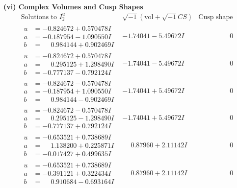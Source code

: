 \documentclass[1p]{elsarticle_modified}
\theoremstyle{definition}
\newcommand{\I}{\sqrt{-1}}
\begin{document}
\newpage\flushleft \textbf{(vi) Complex Volumes and Cusp Shapes}
$$\begin{array}{c|c|c}  
\text{Solutions to }I^u_{2}& \I (\text{vol} + \sqrt{-1}CS) & \text{Cusp shape}\\
 \hline 
\begin{aligned}
u &= -0.824672 + 0.570478 I \\
a &= -0.187954 - 1.090550 I \\
b &= \phantom{-}0.984144 + 0.902469 I\end{aligned}
 & -1.74041 - 5.49672 I & \phantom{-0.000000 } 0 \\ \hline\begin{aligned}
u &= -0.824672 + 0.570478 I \\
a &= \phantom{-}0.295125 + 1.298490 I \\
b &= -0.777137 - 0.792124 I\end{aligned}
 & -1.74041 - 5.49672 I & \phantom{-0.000000 } 0 \\ \hline\begin{aligned}
u &= -0.824672 - 0.570478 I \\
a &= -0.187954 + 1.090550 I \\
b &= \phantom{-}0.984144 - 0.902469 I\end{aligned}
 & -1.74041 + 5.49672 I & \phantom{-0.000000 } 0 \\ \hline\begin{aligned}
u &= -0.824672 - 0.570478 I \\
a &= \phantom{-}0.295125 - 1.298490 I \\
b &= -0.777137 + 0.792124 I\end{aligned}
 & -1.74041 + 5.49672 I & \phantom{-0.000000 } 0 \\ \hline\begin{aligned}
u &= -0.653521 + 0.738689 I \\
a &= \phantom{-}1.138200 + 0.225871 I \\
b &= -0.017427 + 0.499635 I\end{aligned}
 & \phantom{-}0.87960 + 2.11142 I & \phantom{-0.000000 } 0 \\ \hline\begin{aligned}
u &= -0.653521 + 0.738689 I \\
a &= -0.391121 + 0.322434 I \\
b &= \phantom{-}0.910684 - 0.693164 I\end{aligned}
 & \phantom{-}0.87960 + 2.11142 I & \phantom{-0.000000 } 0 \\ \hline\begin{aligned}

\end{aligned}
\end{array}$$
\end{document}
